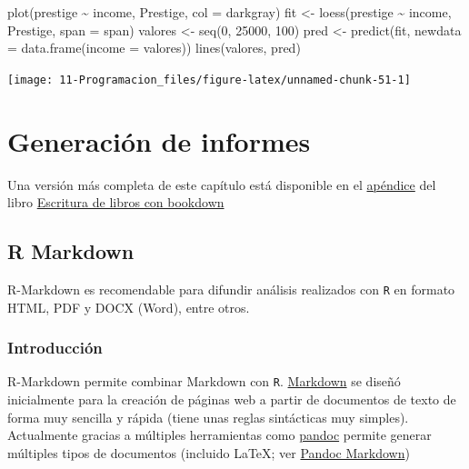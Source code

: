 \documentclass[
]{book}
\newenvironment{Shaded}{\begin{snugshade}}{\end{snugshade}}
\newcommand{\AttributeTok}[1]{\textcolor[rgb]{0.77,0.63,0.00}{#1}}
\newcommand{\DecValTok}[1]{\textcolor[rgb]{0.00,0.00,0.81}{#1}}
\newcommand{\FunctionTok}[1]{\textcolor[rgb]{0.00,0.00,0.00}{#1}}
\newcommand{\NormalTok}[1]{#1}
\newcommand{\OtherTok}[1]{\textcolor[rgb]{0.56,0.35,0.01}{#1}}
\newcommand{\SpecialCharTok}[1]{\textcolor[rgb]{0.00,0.00,0.00}{#1}}
\newcommand{\StringTok}[1]{\textcolor[rgb]{0.31,0.60,0.02}{#1}}
\theoremstyle{break}
\theoremstyle{nonumberplain}
\begin{document}
\begin{Shaded}
\begin{Highlighting}[]
\FunctionTok{plot}\NormalTok{(prestige }\SpecialCharTok{\textasciitilde{}}\NormalTok{ income, Prestige, }\AttributeTok{col =} \StringTok{\textquotesingle{}darkgray\textquotesingle{}}\NormalTok{)}
\NormalTok{fit }\OtherTok{\textless{}{-}} \FunctionTok{loess}\NormalTok{(prestige }\SpecialCharTok{\textasciitilde{}}\NormalTok{ income, Prestige, }\AttributeTok{span =}\NormalTok{ span)}
\NormalTok{valores }\OtherTok{\textless{}{-}} \FunctionTok{seq}\NormalTok{(}\DecValTok{0}\NormalTok{, }\DecValTok{25000}\NormalTok{, }\DecValTok{100}\NormalTok{)}
\NormalTok{pred }\OtherTok{\textless{}{-}} \FunctionTok{predict}\NormalTok{(fit, }\AttributeTok{newdata =} \FunctionTok{data.frame}\NormalTok{(}\AttributeTok{income =}\NormalTok{ valores))}
\FunctionTok{lines}\NormalTok{(valores, pred)}
\end{Highlighting}
\end{Shaded}

\begin{center}\texttt{[image: 11-Programacion\_files/figure-latex/unnamed-chunk-51-1]} \end{center}

\hypertarget{generaciuxf3n-de-informes}{%
\chapter{Generación de informes}\label{generaciuxf3n-de-informes}}

Una versión más completa de este capítulo está disponible en el
\href{https://rubenfcasal.github.io/bookdown_intro/rmarkdown.html}{apéndice} del libro
\href{https://rubenfcasal.github.io/bookdown_intro}{Escritura de libros con bookdown}

\hypertarget{r-markdown}{%
\section{R Markdown}\label{r-markdown}}

R-Markdown es recomendable para difundir análisis realizados con \texttt{R} en formato HTML, PDF y DOCX (Word), entre otros.

\hypertarget{introducciuxf3n-1}{%
\subsection{Introducción}\label{introducciuxf3n-1}}

R-Markdown permite combinar Markdown con \texttt{R}. \href{http://daringfireball.net/projects/markdown/}{Markdown} se diseñó inicialmente para la creación de páginas web a partir de documentos de texto de forma muy sencilla y rápida (tiene unas reglas sintácticas muy simples). Actualmente gracias a múltiples herramientas como \href{http://pandoc.org/}{pandoc} permite generar múltiples tipos de documentos (incluido LaTeX; ver \href{http://rmarkdown.rstudio.com/authoring_pandoc_markdown.html}{Pandoc Markdown})
\end{document}
